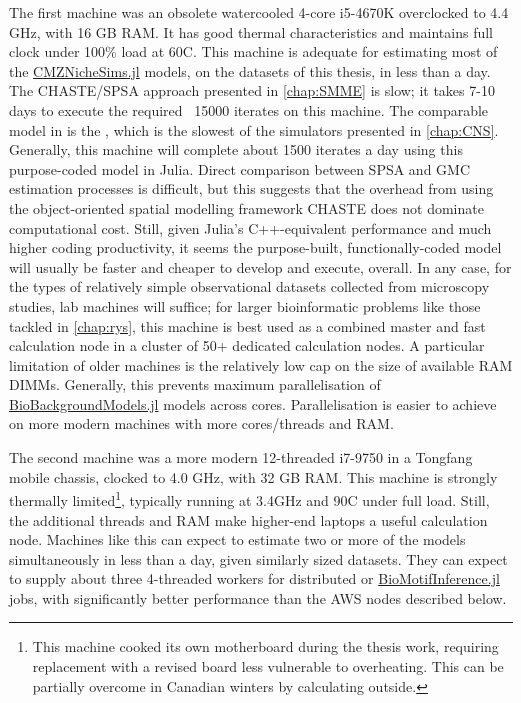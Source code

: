 The first machine was an obsolete watercooled 4-core i5-4670K overclocked to 4.4 GHz, with 16 GB RAM. It has good thermal characteristics and maintains full clock under 100\% load at 60\textdegree C. This machine is adequate for estimating most of the \hyperref[chap:CNS]{CMZNicheSims.jl} models, on the datasets of this thesis, in less than a day. The CHASTE/SPSA approach presented in \autoref{chap:SMME} is slow; it takes 7-10 days to execute the required ~15000 iterates on this machine. The comparable model in  is the , which is the slowest of the simulators presented in \autoref{chap:CNS}. Generally, this machine will complete about 1500 iterates a day using this purpose-coded model in Julia. Direct comparison between SPSA and GMC estimation processes is difficult, but this suggests that the overhead from using the object-oriented spatial modelling framework CHASTE does not dominate computational cost. Still, given Julia's C++-equivalent performance and much higher coding productivity, it seems the purpose-built, functionally-coded model will usually be faster and cheaper to develop and execute, overall. In any case, for the types of relatively simple observational datasets collected from microscopy studies, lab machines will suffice; for larger bioinformatic problems like those tackled in \autoref{chap:rys}, this machine is best used as a combined master and fast calculation node in a cluster of 50+ dedicated calculation nodes. A particular limitation of older machines is the relatively low cap on the size of available RAM DIMMs. Generally, this prevents maximum parallelisation of \hyperref[chap:BBM]{BioBackgroundModels.jl} models across cores. Parallelisation is easier to achieve on more modern machines with more cores/threads and RAM. 

The second machine was a more modern 12-threaded i7-9750 in a Tongfang mobile chassis, clocked to 4.0 GHz, with 32 GB RAM. This machine is strongly thermally limited\footnote{This machine cooked its own motherboard during the thesis work, requiring replacement with a revised board less vulnerable to overheating. This can be partially overcome in Canadian winters by calculating outside.}, typically running at 3.4GHz and 90\textdegree C under full load. Still, the additional threads and RAM make higher-end laptops a useful calculation node. Machines like this can expect to estimate two or more of the  models simultaneously in less than a day, given similarly sized datasets. They can expect to supply about three 4-threaded workers for distributed  or \hyperref[chap:BBM]{BioMotifInference.jl} jobs, with significantly better performance than the AWS nodes described below.

